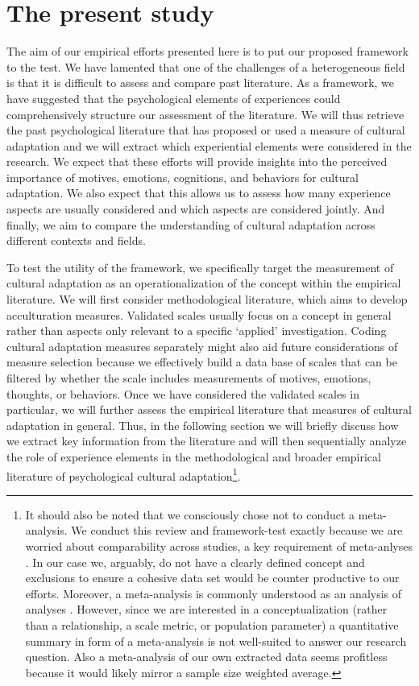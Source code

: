\documentclass[man, 12pt, a4paper]{apa7}
\begin{document}
\section{The present study}
The aim of our empirical efforts presented here is to put our proposed framework to the test. We have lamented that one of the challenges of a heterogeneous field is that it is difficult to assess and compare past literature. As a framework, we have suggested that the psychological elements of experiences could comprehensively structure our assessment of the literature. We will thus retrieve the past psychological literature that has proposed or used a measure of cultural adaptation and we will extract which experiential elements were considered in the research. We expect that these efforts will provide insights into the perceived importance of motives, emotions, cognitions, and behaviors for cultural adaptation. We also expect that this allows us to assess how many experience aspects are usually considered and which aspects are considered jointly. And finally, we aim to compare the understanding of cultural adaptation across different contexts and fields. 

To test the utility of the framework, we specifically target the measurement of cultural adaptation as an operationalization of the concept within the empirical literature. We will first consider methodological literature, which aims to develop acculturation measures. Validated scales usually focus on a concept in general rather than aspects only relevant to a specific `applied' investigation. Coding cultural adaptation measures separately might also aid future considerations of measure selection because we effectively build a data base of scales that can be filtered by whether the scale includes measurements of motives, emotions, thoughts, or behaviors. Once we have considered the validated scales in particular, we will further assess the empirical literature that measures of cultural adaptation in general. Thus, in the following section we will briefly discuss how we extract key information from the literature and will then sequentially analyze the role of experience elements in the methodological and broader empirical literature of psychological cultural adaptation\footnote{It should also be noted that we consciously chose not to conduct a meta-analysis. We conduct this review and framework-test exactly because we are worried about comparability across studies, a key requirement of meta-anlyses \citep{Pogue1998}. In our case we, arguably, do not have a clearly defined concept and exclusions to ensure a cohesive data set would be counter productive to our efforts. Moreover, a meta-analysis is commonly understood as an analysis of analyses \citep{Glass1976}. However, since we are interested in a conceptualization (rather than a relationship, a scale metric, or population parameter) a quantitative summary in form of a meta-analysis is not well-suited to answer our research question. Also a meta-analysis of our own extracted data seems profitless because it would likely mirror a sample size weighted average.}.
\end{document}
